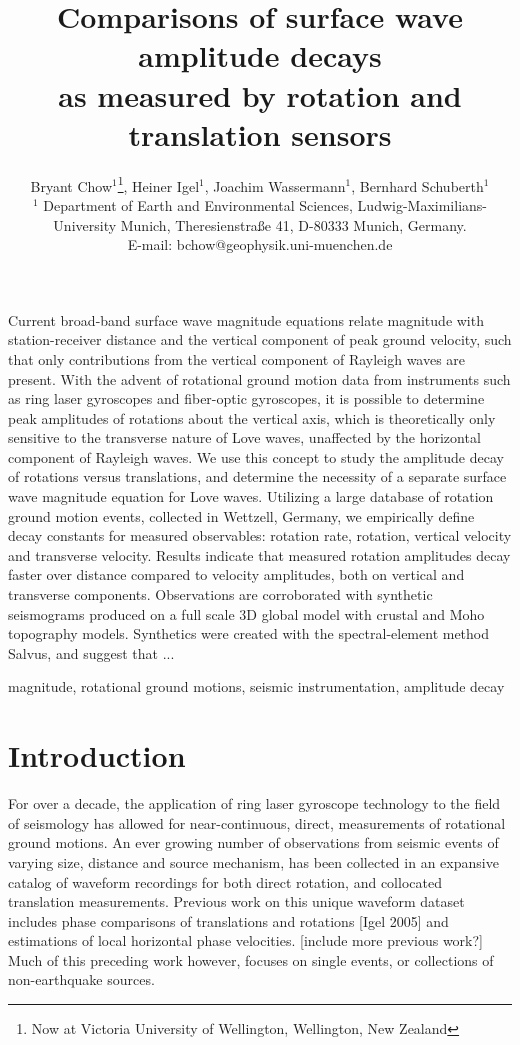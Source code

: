 \documentclass{gji}
\title[Comparisons of surface wave amplitude decays]
  {Comparisons of surface wave amplitude decays \\as measured by rotation and translation sensors}
\author[Bryant Chow]
  {Bryant Chow$^1$\thanks{Now at Victoria University of Wellington, Wellington, New Zealand}, 
  Heiner Igel$^1$, 
  Joachim Wassermann$^1$,
  Bernhard Schuberth$^1$\\
  $^1$ Department of Earth and Environmental Sciences, Ludwig-Maximilians-University Munich, Theresienstra\ss e 41, D-80333 Munich, Germany. \\E-mail: bchow@geophysik.uni-muenchen.de
  }
\date{}
\begin{document}
\label{firstpage}

\maketitle

\begin{summary}
Current broad-band surface wave magnitude equations relate magnitude with station-receiver distance and the vertical component of peak ground velocity, such that only contributions from the vertical component of Rayleigh waves are present. With the advent of rotational ground motion data from instruments such as ring laser gyroscopes and fiber-optic gyroscopes, it is possible to determine peak amplitudes of rotations about the vertical axis, which is theoretically only sensitive to the transverse nature of Love waves, unaffected by the horizontal component of Rayleigh waves. We use this concept to study the amplitude decay of rotations versus translations, and determine the necessity of a separate surface wave magnitude equation for Love waves. Utilizing a large database of rotation ground motion events, collected in Wettzell, Germany, we empirically define decay constants for measured observables: rotation rate, rotation, vertical velocity and transverse velocity. Results indicate that measured rotation amplitudes decay faster over distance compared to velocity amplitudes, both on vertical and transverse components. Observations are corroborated with synthetic seismograms produced on a full scale 3D global model with crustal and Moho topography models. Synthetics were created with the spectral-element method Salvus, and suggest that ...
\end{summary}

\begin{keywords}
magnitude, rotational ground motions, seismic instrumentation, amplitude decay
\end{keywords}

\section{Introduction} 
For over a decade, the application of ring laser gyroscope technology to the field of seismology has allowed for near-continuous, direct, measurements of rotational ground motions. An ever growing number of observations from seismic events of varying size, distance and source mechanism, has been collected in an expansive catalog of waveform recordings for both direct rotation, and collocated translation measurements.
Previous work on this unique waveform dataset includes phase comparisons of translations and rotations [Igel 2005] %
and estimations of local horizontal phase velocities. [include more previous work?] %
Much of this preceding work however, focuses on single events, or collections of non-earthquake sources. 
\end{document}
